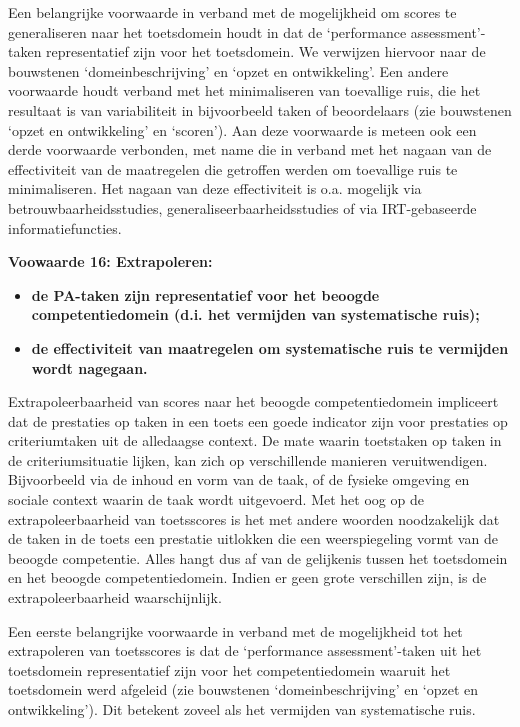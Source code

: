 \documentclass[
  letterpaper,
]{report}
\providecommand{\tightlist}{%
  \setlength{\itemsep}{0pt}\setlength{\parskip}{0pt}}
\begin{document}
Een belangrijke voorwaarde in verband met de mogelijkheid om scores te
generaliseren naar het toetsdomein houdt in dat de `performance
assessment'-taken representatief zijn voor het toetsdomein. We verwijzen
hiervoor naar de bouwstenen `domeinbeschrijving' en `opzet en
ontwikkeling'. Een andere voorwaarde houdt verband met het minimaliseren
van toevallige ruis, die het resultaat is van variabiliteit in
bijvoorbeeld taken of beoordelaars (zie bouwstenen `opzet en
ontwikkeling' en `scoren'). Aan deze voorwaarde is meteen ook een derde
voorwaarde verbonden, met name die in verband met het nagaan van de
effectiviteit van de maatregelen die getroffen werden om toevallige ruis
te minimaliseren. Het nagaan van deze effectiviteit is o.a. mogelijk via
betrouwbaarheidsstudies, generaliseerbaarheidsstudies of via
IRT-gebaseerde informatiefuncties.

\textbf{Voowaarde 16: Extrapoleren:}

\begin{itemize}
\tightlist
\item
  \textbf{de PA-taken zijn representatief voor het beoogde
  competentiedomein (d.i. het vermijden van systematische ruis);}
\item
  \textbf{de effectiviteit van maatregelen om systematische ruis te
  vermijden wordt nagegaan.}
\end{itemize}

Extrapoleerbaarheid van scores naar het beoogde competentiedomein
impliceert dat de prestaties op taken in een toets een goede indicator
zijn voor prestaties op criteriumtaken uit de alledaagse context. De
mate waarin toetstaken op taken in de criteriumsituatie lijken, kan zich
op verschillende manieren veruitwendigen. Bijvoorbeeld via de inhoud en
vorm van de taak, of de fysieke omgeving en sociale context waarin de
taak wordt uitgevoerd. Met het oog op de extrapoleerbaarheid van
toetsscores is het met andere woorden noodzakelijk dat de taken in de
toets een prestatie uitlokken die een weerspiegeling vormt van de
beoogde competentie. Alles hangt dus af van de gelijkenis tussen het
toetsdomein en het beoogde competentiedomein. Indien er geen grote
verschillen zijn, is de extrapoleerbaarheid waarschijnlijk.

Een eerste belangrijke voorwaarde in verband met de mogelijkheid tot het
extrapoleren van toetsscores is dat de `performance assessment'-taken
uit het toetsdomein representatief zijn voor het competentiedomein
waaruit het toetsdomein werd afgeleid (zie bouwstenen
`domeinbeschrijving' en `opzet en ontwikkeling'). Dit betekent zoveel
als het vermijden van systematische ruis.
\end{document}
